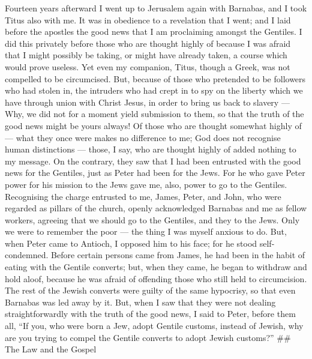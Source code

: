  Fourteen years afterward I went up to Jerusalem again with
Barnabas, and I took Titus also with me.  It was in
obedience to a revelation that I went; and I laid before the apostles
the good news that I am proclaiming amongst the Gentiles. I did this
privately before those who are thought highly of because I was afraid
that I might possibly be taking, or might have already taken, a course
which would prove useless.  Yet even my companion, Titus,
though a Greek, was not compelled to be circumcised.  But,
because of those who pretended to be followers who had stolen in, the
intruders who had crept in to spy on the liberty which we have through
union with Christ Jesus, in order to bring us back to slavery ---
 Why, we did not for a moment yield submission to them, so
that the truth of the good news might be yours always!  Of
those who are thought somewhat highly of --- what they once were makes
no difference to me; God does not recognise human distinctions ---
those, I say, who are thought highly of added nothing to my message.
 On the contrary, they saw that I had been entrusted with
the good news for the Gentiles, just as Peter had been for the Jews.
 For he who gave Peter power for his mission to the Jews
gave me, also, power to go to the Gentiles.  Recognising the
charge entrusted to me, James, Peter, and John, who were regarded as
pillars of the church, openly acknowledged Barnabas and me as fellow
workers, agreeing that we should go to the Gentiles, and they to the
Jews.  Only we were to remember the poor --- the thing I
was myself anxious to do.  But, when Peter came to Antioch,
I opposed him to his face; for he stood self-condemned. 
Before certain persons came from James, he had been in the habit of
eating with the Gentile converts; but, when they came, he began to
withdraw and hold aloof, because he was afraid of offending those who
still held to circumcision.  The rest of the Jewish
converts were guilty of the same hypocrisy, so that even Barnabas was
led away by it.  But, when I saw that they were not dealing
straightforwardly with the truth of the good news, I said to Peter,
before them all, ``If you, who were born a Jew, adopt Gentile customs,
instead of Jewish, why are you trying to compel the Gentile converts to
adopt Jewish customs?'' \#\# The Law and the Gospel

